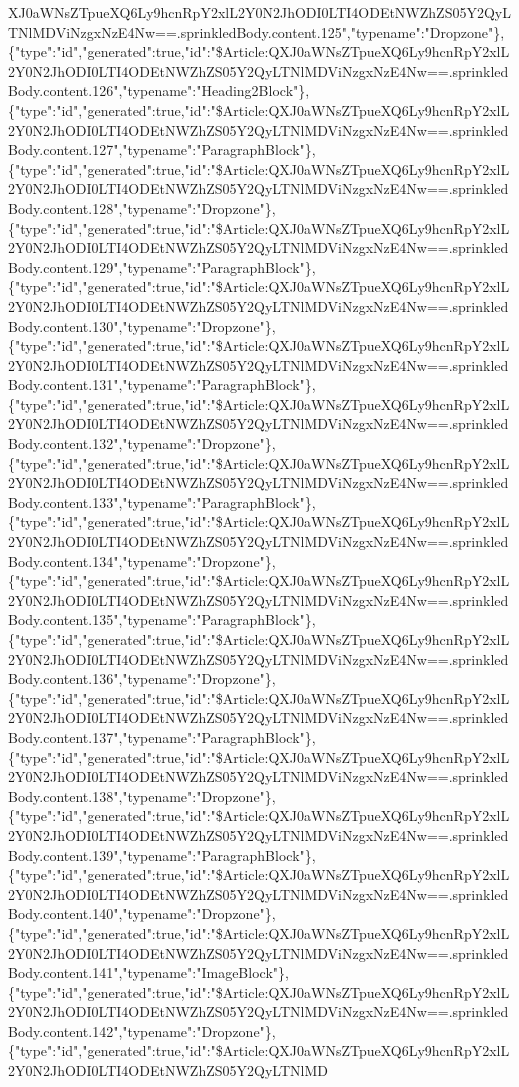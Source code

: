 XJ0aWNsZTpueXQ6Ly9hcnRpY2xlL2Y0N2JhODI0LTI4ODEtNWZhZS05Y2QyLTNlMDViNzgxNzE4Nw==.sprinkledBody.content.125","typename":"Dropzone"\},\{"type":"id","generated":true,"id":"\$Article:QXJ0aWNsZTpueXQ6Ly9hcnRpY2xlL2Y0N2JhODI0LTI4ODEtNWZhZS05Y2QyLTNlMDViNzgxNzE4Nw==.sprinkledBody.content.126","typename":"Heading2Block"\},\{"type":"id","generated":true,"id":"\$Article:QXJ0aWNsZTpueXQ6Ly9hcnRpY2xlL2Y0N2JhODI0LTI4ODEtNWZhZS05Y2QyLTNlMDViNzgxNzE4Nw==.sprinkledBody.content.127","typename":"ParagraphBlock"\},\{"type":"id","generated":true,"id":"\$Article:QXJ0aWNsZTpueXQ6Ly9hcnRpY2xlL2Y0N2JhODI0LTI4ODEtNWZhZS05Y2QyLTNlMDViNzgxNzE4Nw==.sprinkledBody.content.128","typename":"Dropzone"\},\{"type":"id","generated":true,"id":"\$Article:QXJ0aWNsZTpueXQ6Ly9hcnRpY2xlL2Y0N2JhODI0LTI4ODEtNWZhZS05Y2QyLTNlMDViNzgxNzE4Nw==.sprinkledBody.content.129","typename":"ParagraphBlock"\},\{"type":"id","generated":true,"id":"\$Article:QXJ0aWNsZTpueXQ6Ly9hcnRpY2xlL2Y0N2JhODI0LTI4ODEtNWZhZS05Y2QyLTNlMDViNzgxNzE4Nw==.sprinkledBody.content.130","typename":"Dropzone"\},\{"type":"id","generated":true,"id":"\$Article:QXJ0aWNsZTpueXQ6Ly9hcnRpY2xlL2Y0N2JhODI0LTI4ODEtNWZhZS05Y2QyLTNlMDViNzgxNzE4Nw==.sprinkledBody.content.131","typename":"ParagraphBlock"\},\{"type":"id","generated":true,"id":"\$Article:QXJ0aWNsZTpueXQ6Ly9hcnRpY2xlL2Y0N2JhODI0LTI4ODEtNWZhZS05Y2QyLTNlMDViNzgxNzE4Nw==.sprinkledBody.content.132","typename":"Dropzone"\},\{"type":"id","generated":true,"id":"\$Article:QXJ0aWNsZTpueXQ6Ly9hcnRpY2xlL2Y0N2JhODI0LTI4ODEtNWZhZS05Y2QyLTNlMDViNzgxNzE4Nw==.sprinkledBody.content.133","typename":"ParagraphBlock"\},\{"type":"id","generated":true,"id":"\$Article:QXJ0aWNsZTpueXQ6Ly9hcnRpY2xlL2Y0N2JhODI0LTI4ODEtNWZhZS05Y2QyLTNlMDViNzgxNzE4Nw==.sprinkledBody.content.134","typename":"Dropzone"\},\{"type":"id","generated":true,"id":"\$Article:QXJ0aWNsZTpueXQ6Ly9hcnRpY2xlL2Y0N2JhODI0LTI4ODEtNWZhZS05Y2QyLTNlMDViNzgxNzE4Nw==.sprinkledBody.content.135","typename":"ParagraphBlock"\},\{"type":"id","generated":true,"id":"\$Article:QXJ0aWNsZTpueXQ6Ly9hcnRpY2xlL2Y0N2JhODI0LTI4ODEtNWZhZS05Y2QyLTNlMDViNzgxNzE4Nw==.sprinkledBody.content.136","typename":"Dropzone"\},\{"type":"id","generated":true,"id":"\$Article:QXJ0aWNsZTpueXQ6Ly9hcnRpY2xlL2Y0N2JhODI0LTI4ODEtNWZhZS05Y2QyLTNlMDViNzgxNzE4Nw==.sprinkledBody.content.137","typename":"ParagraphBlock"\},\{"type":"id","generated":true,"id":"\$Article:QXJ0aWNsZTpueXQ6Ly9hcnRpY2xlL2Y0N2JhODI0LTI4ODEtNWZhZS05Y2QyLTNlMDViNzgxNzE4Nw==.sprinkledBody.content.138","typename":"Dropzone"\},\{"type":"id","generated":true,"id":"\$Article:QXJ0aWNsZTpueXQ6Ly9hcnRpY2xlL2Y0N2JhODI0LTI4ODEtNWZhZS05Y2QyLTNlMDViNzgxNzE4Nw==.sprinkledBody.content.139","typename":"ParagraphBlock"\},\{"type":"id","generated":true,"id":"\$Article:QXJ0aWNsZTpueXQ6Ly9hcnRpY2xlL2Y0N2JhODI0LTI4ODEtNWZhZS05Y2QyLTNlMDViNzgxNzE4Nw==.sprinkledBody.content.140","typename":"Dropzone"\},\{"type":"id","generated":true,"id":"\$Article:QXJ0aWNsZTpueXQ6Ly9hcnRpY2xlL2Y0N2JhODI0LTI4ODEtNWZhZS05Y2QyLTNlMDViNzgxNzE4Nw==.sprinkledBody.content.141","typename":"ImageBlock"\},\{"type":"id","generated":true,"id":"\$Article:QXJ0aWNsZTpueXQ6Ly9hcnRpY2xlL2Y0N2JhODI0LTI4ODEtNWZhZS05Y2QyLTNlMDViNzgxNzE4Nw==.sprinkledBody.content.142","typename":"Dropzone"\},\{"type":"id","generated":true,"id":"\$Article:QXJ0aWNsZTpueXQ6Ly9hcnRpY2xlL2Y0N2JhODI0LTI4ODEtNWZhZS05Y2QyLTNlMD